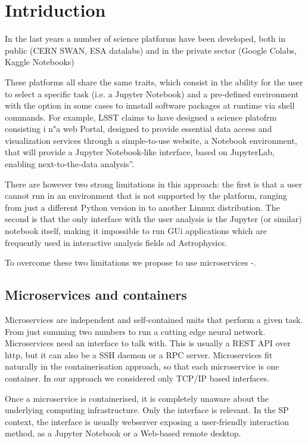 \documentclass[11pt,twoside]{article}
\begin{document}
\section{Intriduction}
In the last years a number of science platforms have been developed, both in public (CERN SWAN, ESA datalabs) and in the private sector (Google Colabs, Kaggle Notebooks) \citep[such as][]{juric2017lsst}


These platforms all share the same traits, which consist in the ability for the user to select a specific task (i.e. a Jupyter Notebook) and a pre-defined environment with the option in some cases to innstall software packages at runtime via shell commands. For example, LSST claims to have designed a science platofrm consisting i n"a web Portal, designed to provide essential data access and visualization services through a simple-to-use website, a Notebook environment, that will provide a Jupyter Notebook-like interface, based on JupyterLab, enabling next-to-the-data analysis”.

There are however two strong limitations in this approach: the first is that a user cannot run in an environment that is not supported by the platform, ranging from just a different Python version in to another Linnux distribution. The second is that the only interface with the user analysis is the Jupyter (or similar) notebook itself, making it impossible to run GUi applications which are frequently used in interactive analysis fields ad Astrophysics.

To overcome these two limitations we propose to use microservices -.


\subsection{Microservices and containers}
Microservices are independent and self-contained units that perform a given task. From just summing two numbers to run a cutting edge neural network. Microservices need an interface to talk with. This is usually a REST API over http, but it can also be a SSH daemon or a RPC server. Microservices fit naturally in the containerisation approach, so that each microservice is one container.  In our approach we considered only TCP/IP based interfaces.

Once a microservice is containerised, it is completely unaware about the underlying computing infrastructure. Only the interface is relevant. In the SP context, the interface is usually webserver exposing a user-friendly interaction method, as a Jupyter Notebook or a Web-based remote desktop.
\end{document}
